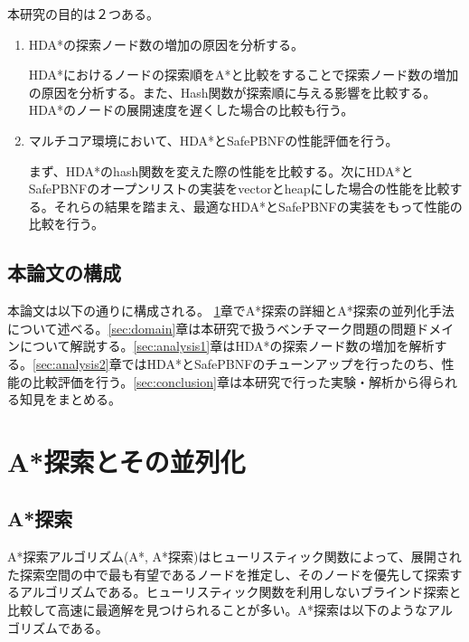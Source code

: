 \documentclass[uplatex]{jsarticle}
\begin{document}
本研究の目的は２つある。

\begin{enumerate}
\item HDA*の探索ノード数の増加の原因を分析する。
\newline

HDA*におけるノードの探索順をA*と比較をすることで探索ノード数の増加の原因を分析する。また、Hash関数が探索順に与える影響を比較する。HDA*のノードの展開速度を遅くした場合の比較も行う。
\newline

\item マルチコア環境において、HDA*とSafePBNFの性能評価を行う。
\newline

まず、HDA*のhash関数を変えた際の性能を比較する。次にHDA*とSafePBNFのオープンリストの実装をvectorとheapにした場合の性能を比較する。それらの結果を踏まえ、最適なHDA*とSafePBNFの実装をもって性能の比較を行う。

\end{enumerate}


\subsection{本論文の構成}

本論文は以下の通りに構成される。
\ref{sec:define}章でA*探索の詳細とA*探索の並列化手法について述べる。\ref{sec:domain}章は本研究で扱うベンチマーク問題の問題ドメインについて解説する。\ref{sec:analysis1}章はHDA*の探索ノード数の増加を解析する。\ref{sec:analysis2}章ではHDA*とSafePBNFのチューンアップを行ったのち、性能の比較評価を行う。\ref{sec:conclusion}章は本研究で行った実験・解析から得られる知見をまとめる。

\section{A*探索とその並列化}
\label{sec:define}
\subsection{A*探索}

A*探索アルゴリズム(A*, A*探索)はヒューリスティック関数によって、展開された探索空間の中で最も有望であるノードを推定し、そのノードを優先して探索するアルゴリズムである\cite{Hart1968}。ヒューリスティック関数を利用しないブラインド探索と比較して高速に最適解を見つけられることが多い。A*探索は以下のようなアルゴリズムである。
\end{document}
